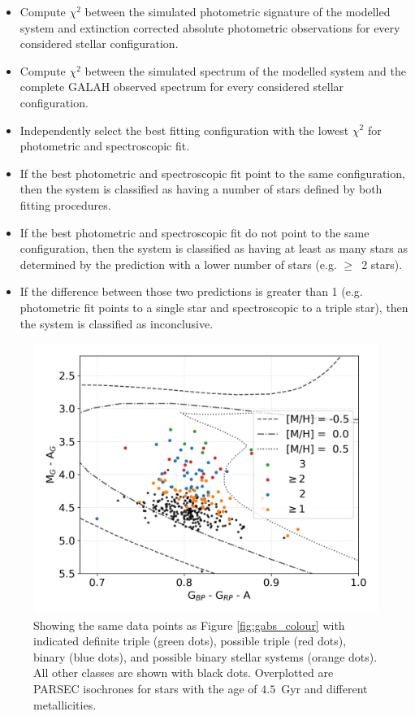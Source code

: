 \begin{itemize}
	\item Compute $\chi^2$ between the simulated photometric signature of the modelled system and extinction corrected absolute photometric observations for every considered stellar configuration. 
	\item Compute $\chi^2$ between the simulated spectrum of the modelled system and the complete GALAH observed spectrum for every considered stellar configuration. 
	\item Independently select the best fitting configuration with the lowest $\chi^2$ for photometric and spectroscopic fit.
	\item If the best photometric and spectroscopic fit point to the same configuration, then the system is classified as having a number of stars defined by both fitting procedures.
	\item If the best photometric and spectroscopic fit do not point to the same configuration, then the system is classified as having at least as many stars as determined by the prediction with a lower number of stars (e.g. $\geq$~2 stars).
	\item If the difference between those two predictions is greater than 1 (e.g. photometric fit points to a single star and spectroscopic to a triple star), then the system is classified as inconclusive. 
\end{itemize}

\begin{figure}
	\centering
	\includegraphics[width=\columnwidth]{mag_hr_gaia_bin-multi_iso_45Gyr_res_ebv_c3_07.png}
	\caption{Showing the same data points as Figure \ref{fig:gabs_colour} with indicated definite triple (green dots), possible triple (red dots), binary (blue dots), and possible binary stellar systems (orange dots). All other classes are shown with black dots. Overplotted are PARSEC isochrones \citep{2017ApJ...835...77M} for stars with the age of $4.5$~Gyr and different metallicities.}
	\label{fig:gabs_binmulti}
\end{figure}



